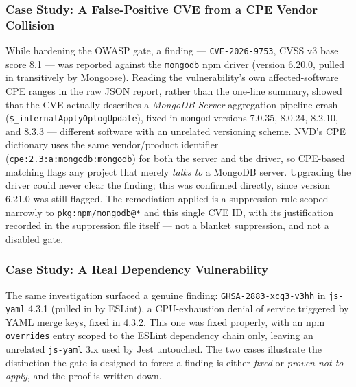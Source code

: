\documentclass[11pt,a4paper]{article}
\begin{document}
\subsubsection{Case Study: A False-Positive CVE from a CPE Vendor Collision}
While hardening the OWASP gate, a finding --- \texttt{CVE-2026-9753}, CVSS
v3 base score 8.1 --- was reported against the \texttt{mongodb} npm driver
(version 6.20.0, pulled in transitively by Mongoose). Reading the
vulnerability's own affected-software CPE ranges in the raw JSON report,
rather than the one-line summary, showed that the CVE actually describes a
\emph{MongoDB Server} aggregation-pipeline crash
(\texttt{\$\_internalApplyOplogUpdate}), fixed in \texttt{mongod} versions
7.0.35, 8.0.24, 8.2.10, and 8.3.3 --- different software with an unrelated
versioning scheme. NVD's CPE dictionary uses the same vendor/product
identifier (\texttt{cpe:2.3:a:mongodb:mongodb}) for both the server and
the driver, so CPE-based matching flags any project that merely
\emph{talks to} a MongoDB server. Upgrading the driver could never clear
the finding; this was confirmed directly, since version 6.21.0 was still
flagged. The remediation applied is a suppression rule scoped narrowly to
\texttt{pkg:npm/mongodb@*} and this single CVE ID, with its justification
recorded in the suppression file itself --- not a blanket suppression, and
not a disabled gate.

\subsubsection{Case Study: A Real Dependency Vulnerability}
The same investigation surfaced a genuine finding:
\texttt{GHSA-2883-xcg3-v3hh} in \texttt{js-yaml} 4.3.1 (pulled in by ESLint),
a CPU-exhaustion denial of service triggered by YAML merge keys, fixed in
4.3.2. This one was fixed properly, with an npm \texttt{overrides} entry
scoped to the ESLint dependency chain only, leaving an unrelated
\texttt{js-yaml} 3.x used by Jest untouched. The two cases illustrate the
distinction the gate is designed to force: a finding is either
\emph{fixed} or \emph{proven not to apply}, and the proof is written down.
\end{document}
